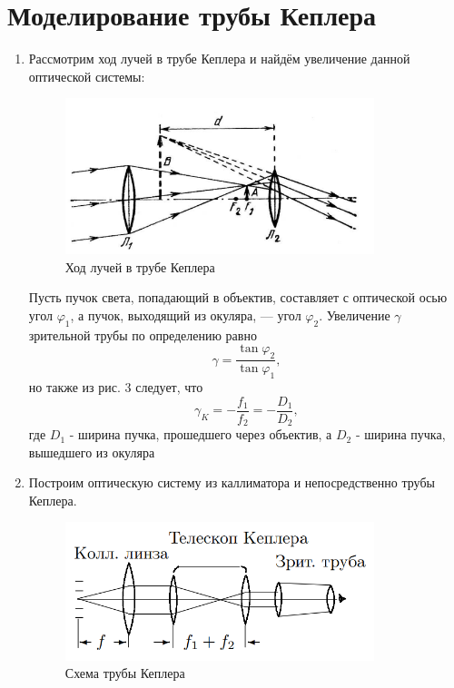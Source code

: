\documentclass[a4paper,12pt]{article}
\begin{document}
\section*{Моделирование трубы Кеплера}
\begin{enumerate}
    \item Рассмотрим ход лучей в трубе Кеплера и найдём увеличение данной оптической системы:
    
\begin{figure}[h]
    \centering
    \includegraphics[width=9cm]{kepler.PNG}
    \caption{Ход лучей в трубе Кеплера}
\end{figure}

Пусть пучок света, попадающий в объектив, составляет с оптической осью угол $\varphi_1$, а пучок, выходящий из окуляра, — угол $\varphi_2$. Увеличение $\gamma$ зрительной трубы по определению равно
\begin{equation}
    \gamma = \frac{\tan \varphi_2}{\tan \varphi_1},
\end{equation}
но также из рис. 3 следует, что 
\begin{equation}
    \gamma_K = -\frac{f_1}{f_2} = -\frac{D_1}{D_2},
\end{equation}
где $D_1$ - ширина пучка, прошедшего через объектив, а $D_2$ - ширина пучка, вышедшего из окуляра

\item Построим оптическую систему из каллиматора и непосредственно трубы Кеплера. 

    \begin{figure}[h]
    \centering
    \includegraphics[width=9cm]{kepler_2.PNG}
    \caption{Схема трубы Кеплера}
\end{figure}


\end{enumerate}
\end{document}

